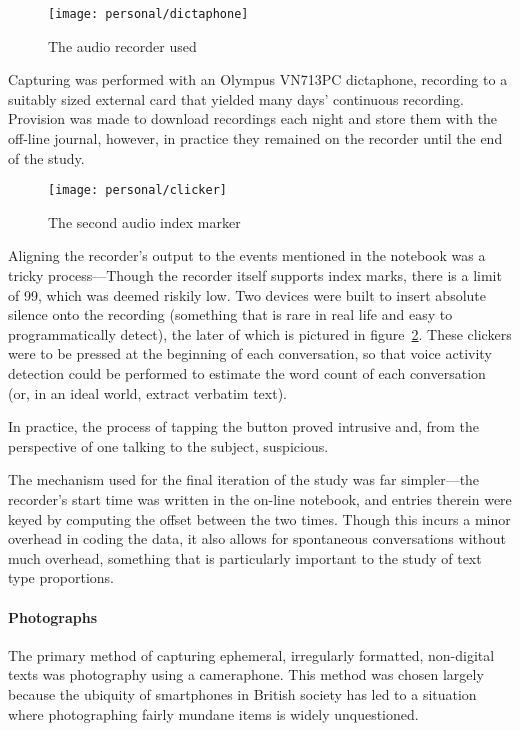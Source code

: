 \begin{figure}[p]
    \centering
    \texttt{[image: personal/dictaphone]}
    \caption{The audio recorder used}
    \label{fig:personal:audiorecorder}
\end{figure}



Capturing was performed with an Olympus VN713PC dictaphone, recording to a suitably sized external card that yielded many days' continuous recording.  Provision was made to download recordings each night and store them with the off-line journal, however, in practice they remained on the recorder until the end of the study.


\begin{figure}[p]
    \centering
    \texttt{[image: personal/clicker]}
    \caption{The second audio index marker}
    \label{fig:personal:clicker}
\end{figure}


Aligning the recorder's output to the events mentioned in the notebook was a tricky process---Though the recorder itself supports index marks, there is a limit of 99, which was deemed riskily low.  Two devices were built to insert absolute silence onto the recording (something that is rare in real life and easy to programmatically detect), the later of which is pictured in figure~\ref{fig:personal:clicker}.  These clickers were to be pressed at the beginning of each conversation, so that voice activity detection could be performed to estimate the word count of each conversation (or, in an ideal world, extract verbatim text).

In practice, the process of tapping the button proved intrusive and, from the perspective of one talking to the subject, suspicious.

The mechanism used for the final iteration of the study was far simpler---the recorder's start time was written in the on-line notebook, and entries therein were keyed by computing the offset between the two times.  Though this incurs a minor overhead in coding the data, it also allows for spontaneous conversations without much overhead, something that is particularly important to the study of text type proportions.



\paragraph{Photographs}
The primary method of capturing ephemeral, irregularly formatted, non-digital texts was photography using a cameraphone.  This method was chosen largely because the ubiquity of smartphones in British society has led to a situation where photographing fairly mundane items is widely unquestioned.

